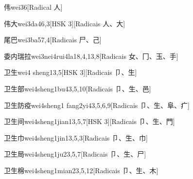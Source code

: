 \begin{entry}{伟}{wei3}{6}[Radical ⼈]
\end{entry}

\begin{entry}{伟大}{wei3da4}{6,3}[HSK 3][Radicais ⼈、⼤]
\end{entry}

\begin{entry}{尾巴}{wei3ba5}{7,4}[Radicais ⼫、⼰]
\end{entry}

\begin{entry}{委内瑞拉}{wei3nei4rui4la1}{8,4,13,8}[Radicais ⼥、⼌、⽟、⼿]
\end{entry}

\begin{entry}{卫生}{wei4 sheng1}{3,5}[HSK 3][Radicais ⼙、⽣]
\end{entry}

\begin{entry}{卫生部}{wei4sheng1bu4}{3,5,10}[Radicais ⼙、⽣、⾢]
\end{entry}

\begin{entry}{卫生防疫}{wei4sheng1 fang2yi4}{3,5,6,9}[Radicais ⼙、⽣、⾩、⽧]
\end{entry}

\begin{entry}{卫生间}{wei4sheng1jian1}{3,5,7}[HSK 3][Radicais ⼙、⽣、⾨]
\end{entry}

\begin{entry}{卫生巾}{wei4sheng1jin1}{3,5,3}[Radicais ⼙、⽣、⼱]
\end{entry}

\begin{entry}{卫生局}{wei4sheng1ju2}{3,5,7}[Radicais ⼙、⽣、⼫]
\end{entry}

\begin{entry}{卫生棉}{wei4sheng1mian2}{3,5,12}[Radicais ⼙、⽣、⽊]
\end{entry}

